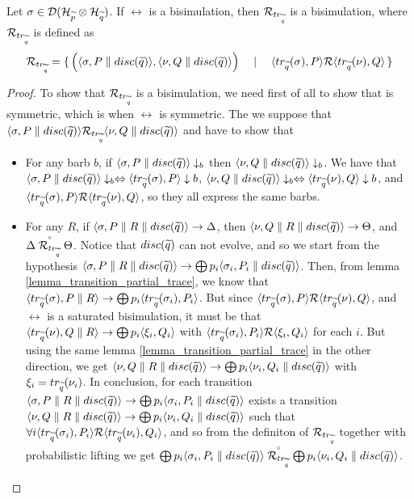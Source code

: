 \newcommand{\relTrQ}{\rel_{\trQ}}
\begin{lemma}
Let $\sigma \in \mathcal{D}(\mathcal{H}_{\widetilde{p}} \otimes \mathcal{H}_{\widetilde{q}})$. If $\rel$ is a bisimulation, then $\mathcal{R}_{tr_{\widetilde{q}}}$ is a bisimulation, where $\mathcal{R}_{tr_{\widetilde{q}}}$ is defined as
\[\mathcal{R}_{tr_{\widetilde{q}}} = \set{\Big(\langle\sigma, P \parallel disc(\widetilde{q})\rangle, \langle\nu, Q \parallel disc(\widetilde{q})\rangle\Big) \quad\mid\quad \langle tr_{\widetilde{q}}(\sigma), P\rangle \mathcal{R}\langle tr_{\widetilde{q}}(\nu), Q\rangle}\]
\end{lemma}
\begin{proof}
To show that $\mathcal{R}_{tr_{\widetilde{q}}}$ is a bisimulation, we need first of all to show that is symmetric, which is when $\rel$ is symmetric. The we suppose that $\confw{\sigma, P \parallel \discQ} \relTrQ \confw{\nu, Q \parallel \discQ}$ and have to show that \begin{itemize}
\item For any barb $b$, if $\langle\sigma, P \parallel disc(\widetilde{q})\rangle \downarrow_b$ then $\langle\nu, Q \parallel disc(\widetilde{q})\rangle \downarrow_b$. We have that $\langle\sigma, P \parallel disc(\widetilde{q})\rangle \downarrow_b \Leftrightarrow \langle tr_{\widetilde{q}}(\sigma), P\rangle \downarrow b$, $\langle\nu, Q \parallel disc(\widetilde{q})\rangle \downarrow_b \Leftrightarrow \langle tr_{\widetilde{q}}(\nu), Q\rangle \downarrow b$, and 
$\langle tr_{\widetilde{q}}(\sigma), P\rangle \mathcal{R} \langle tr_{\widetilde{q}}(\nu), Q\rangle$, so they all express the same barbs.
\item For any $R$, if $\langle\sigma, P \parallel R \parallel disc(\widetilde{q})\rangle \rightarrow \Delta$, then $\langle\nu, Q \parallel R \parallel disc(\widetilde{q})\rangle \rightarrow \Theta$, and $\Delta \slift{\relTrQ} \Theta$. Notice that $disc(\widetilde{q})$ can not evolve, and so we start from the hypothesis $\langle\sigma, P \parallel R \parallel disc(\widetilde{q})\rangle \rightarrow \bigoplus p_i \langle\sigma_i, P_i \parallel disc(\widetilde{q})\rangle$. Then, from lemma \ref{lemma_transition_partial_trace}, we know that $\langle tr_{\widetilde{q}}(\sigma), P\parallel R\rangle \rightarrow \bigoplus p_i \langle tr_{\widetilde{q}}(\sigma_i), P_i\rangle$. But since $\langle tr_{\widetilde{q}}(\sigma), P\rangle \mathcal{R} \langle tr_{\widetilde{q}}(\nu), Q\rangle$, and $\rel$ is a saturated bisimulation, it must be that $\langle tr_{\widetilde{q}}(\nu), Q\parallel R\rangle \rightarrow \bigoplus p_i \langle\xi_i, Q_i\rangle$ with $\langle tr_{\widetilde{q}}(\sigma_i), P_i\rangle \mathcal{R} \langle\xi_i, Q_i\rangle$ for each $i$. But using the same lemma \ref{lemma_transition_partial_trace} in the other direction, we get $\langle\nu, Q \parallel R \parallel disc(\widetilde{q})\rangle \rightarrow \bigoplus p_i \langle\nu_i, Q_i \parallel disc(\widetilde{q})\rangle$ with $\xi_i = tr_{\widetilde{q}}(\nu_i)$. In conclusion, for each transition $\langle\sigma, P \parallel R \parallel disc(\widetilde{q})\rangle \rightarrow \bigoplus p_i \langle\sigma_i, P_i \parallel disc(\widetilde{q})\rangle$ exists a transition $\langle\nu, Q \parallel R \parallel disc(\widetilde{q})\rangle \rightarrow \bigoplus p_i \langle\nu_i, Q_i \parallel disc(\widetilde{q})\rangle$ such that $\forall i \langle tr_{\widetilde{q}}(\sigma_i), P_i\rangle \mathcal{R} \langle tr_{\widetilde{q}}(\nu_i), Q_i\rangle$, and so from the definiton of $\relTrQ$ together with probabilistic lifting we get $\bigoplus p_i \confw{\sigma_i, P_i \parallel \discQ} \slift{\relTrQ} \bigoplus p_i \confw{\nu_i, Q_i \parallel \discQ}$.
\end{itemize}
\end{proof}

